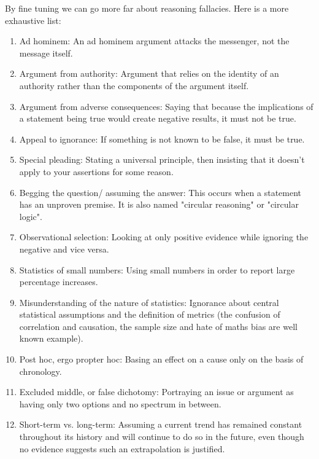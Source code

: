 	By fine tuning we can go more far about reasoning fallacies. Here is a more exhaustive list:
	\begin{enumerate}
		\item Ad hominem: An ad hominem argument attacks the messenger, not the message itself.

		\item Argument from authority: Argument that relies on the identity of an authority rather than the components of the argument itself.

		\item Argument from adverse consequences: Saying that because the implications of a statement being true would create negative results, it must not be true.

		\item Appeal to ignorance: If something is not known to be false, it must be true.

		\item Special pleading: Stating a universal principle, then insisting that it doesn't apply to your assertions for some reason.

		\item Begging the question/ assuming the answer: This occurs when a statement has an unproven premise. It is also named "circular reasoning" or "circular logic".

		\item Observational selection: Looking at only positive evidence while ignoring the negative and vice versa.

		\item Statistics of small numbers: Using small numbers in order to report large percentage increases.

		\item Misunderstanding of the nature of statistics: 	
Ignorance about central statistical assumptions and the definition of metrics (the confusion of correlation and causation, the sample size and hate of maths bias are well known example).

		\item Post hoc, ergo propter hoc: Basing an effect on a cause only on the basis of chronology.

		\item Excluded middle, or false dichotomy: Portraying an issue or argument as having only two options and no spectrum in between.

		\item Short-term vs. long-term: Assuming a current trend has remained constant throughout its history and will continue to do so in the future, even though no evidence suggests such an extrapolation is justified.


\end{enumerate}
